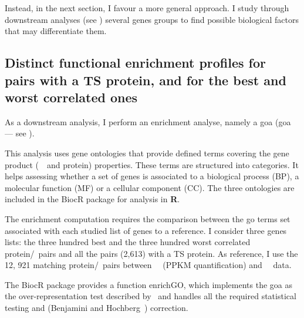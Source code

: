 Instead, in the next section, I favour a more general approach.
I study through downstream analyses (see )
several genes groups
to find possible biological factors that may differentiate them.

\subsection{Distinct functional enrichment profiles
for pairs with a TS protein,
and for the best and worst correlated ones}


As a downstream analysis,
I perform an enrichment analyse,
namely a \glsdesc{goa} (\gls{goa} --- see ).

This analysis uses gene ontologies that provide defined terms
covering the gene product (\ie\ \mRNA\ and protein) properties.
These terms are structured into categories.
It helps assessing whether a set of genes is associated to
a biological process (BP), a molecular function (MF) or a cellular component (CC).
The three ontologies are included
in the \gls{BiocR} package 
for analysis in \textbf{\textsf{R}}.

The enrichment computation requires
the comparison between the \gls{go} terms set associated
with each studied list of genes to a reference.
I consider three genes lists:
the three hundred best and
the three hundred worst correlated protein/\mRNA\ pairs
and all the pairs (2,613) with a \gls{TS} protein.
As reference, I use the 12, 921 matching protein/\mRNA\ pairs
between \pandey\ \etal\ (\gls{PPKM} quantification) and \uhlen\ \etal\ data.

The \gls{BiocR} package 
provides a function \textsf{enrichGO},
which implements the \gls{goa} as the over-representation test
described by~\citet{Boyle2004-dh}
and handles all the required statistical testing
and (Benjamini and Hochberg~) correction.

